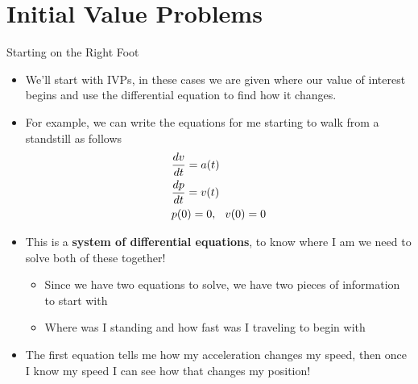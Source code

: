 {}\documentclass[letterpaper,
compress,
xcolor=x11names,
]{beamer}
\begin{document}
\section{Initial Value Problems}

\begin{frame}{Starting on the Right Foot}
	\footnotesize
	\begin{itemize}
		\item We'll start with IVPs, in these cases we are given where our value of interest begins and use the differential equation to find how it changes.
		\item<2-> For example, we can write the equations for me starting to walk from a standstill as follows
		\begin{align*}
			&\frac{dv}{dt} = a(t) \\
			&\frac{dp}{dt} = v(t) \\
			&p(0) = 0,\hspace{0.25cm} v(0) = 0
		\end{align*}
		\item<3-> This is a \textbf{system of differential equations}, to know where I am we need to solve both of these together!
		\begin{itemize}
			\item Since we have two equations to solve, we have two pieces of information to start with
			\item Where was I standing and how fast was I traveling to begin with
		\end{itemize}
		\item<4-> The first equation tells me how my acceleration changes my speed, then once I know my speed I can see how that changes my position!
	\end{itemize}
\end{frame}

\end{document}
